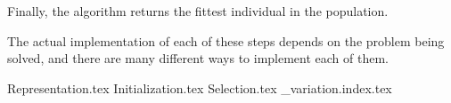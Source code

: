   Finally, the algorithm returns the fittest individual in the population.

  The actual implementation of each of these steps depends on the problem being solved, and there
  are many different ways to implement each of them.

  {Representation.tex}
  {Initialization.tex}
  {Selection.tex}
  {_variation.index.tex}
